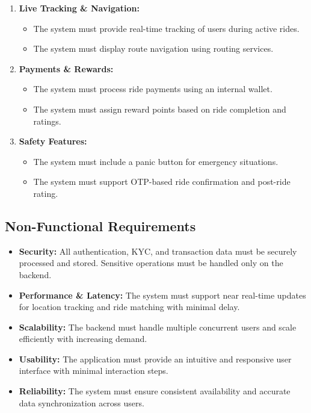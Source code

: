 \documentclass[10pt,a4paper]{report}
\begin{document}
\begin{enumerate}
    \item \textbf{Live Tracking \& Navigation:}
    \begin{itemize}
        \item The system must provide real-time tracking of users during active rides.
        \item The system must display route navigation using routing services.
    \end{itemize}

    \item \textbf{Payments \& Rewards:}
    \begin{itemize}
        \item The system must process ride payments using an internal wallet.
        \item The system must assign reward points based on ride completion and ratings.
    \end{itemize}

    \item \textbf{Safety Features:}
    \begin{itemize}
        \item The system must include a panic button for emergency situations.
        \item The system must support OTP-based ride confirmation and post-ride rating.
    \end{itemize}
\end{enumerate}

\subsection{Non-Functional Requirements}
\large\justify
\begin{itemize}
    \item \textbf{Security:} All authentication, KYC, and transaction data must be securely processed and stored. Sensitive operations must be handled only on the backend.

    \item \textbf{Performance \& Latency:} The system must support near real-time updates for location tracking and ride matching with minimal delay.

    \item \textbf{Scalability:} The backend must handle multiple concurrent users and scale efficiently with increasing demand.

    \item \textbf{Usability:} The application must provide an intuitive and responsive user interface with minimal interaction steps.

    \item \textbf{Reliability:} The system must ensure consistent availability and accurate data synchronization across users.
\end{itemize}
\end{document}
